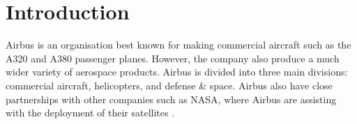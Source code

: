 \section{Introduction}
Airbus is an organisation best known for making commercial aircraft such as the A320 and A380 passenger planes. However, the company also produce a much wider variety of aerospace products. Airbus is divided into three main divisions: commercial aircraft, helicopters, and defense \& space. Airbus also have close partnerships with other companies such as NASA, where Airbus are assisting with the deployment of their satellites \parencite{airbus2018a}.